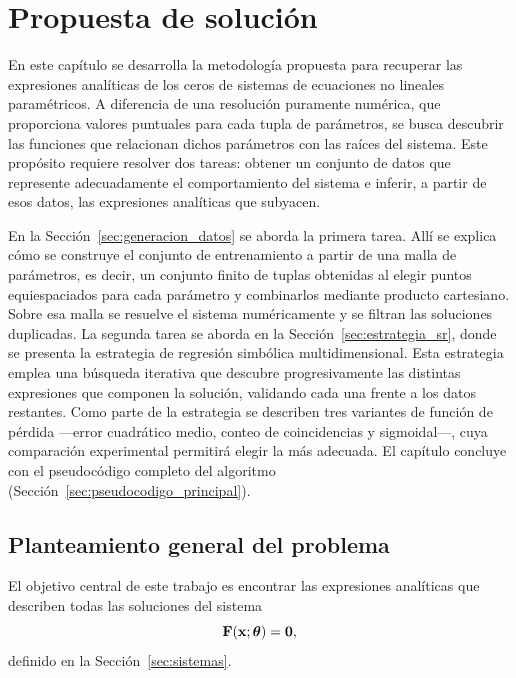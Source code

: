 \chapter{Propuesta de solución}\label{sec:propuesta}

En este capítulo se desarrolla la metodología propuesta para recuperar las expresiones analíticas de los ceros de sistemas de ecuaciones no lineales paramétricos. A diferencia de una resolución puramente numérica, que proporciona valores puntuales para cada tupla de parámetros, se busca descubrir las funciones que relacionan dichos parámetros con las raíces del sistema. Este propósito requiere resolver dos tareas: obtener un conjunto de datos que represente adecuadamente el comportamiento del sistema e inferir, a partir de esos datos, las expresiones analíticas que subyacen.

En la Sección~\ref{sec:generacion_datos} se aborda la primera tarea. Allí se explica cómo se construye el conjunto de entrenamiento a partir de una malla de parámetros, es decir, un conjunto finito de tuplas obtenidas al elegir puntos equiespaciados para cada parámetro y combinarlos mediante producto cartesiano. Sobre esa malla se resuelve el sistema numéricamente y se filtran las soluciones duplicadas. La segunda tarea se aborda en la Sección~\ref{sec:estrategia_sr}, donde se presenta la estrategia de regresión simbólica multidimensional. Esta estrategia emplea una búsqueda iterativa que descubre progresivamente las distintas expresiones que componen la solución, validando cada una frente a los datos restantes. Como parte de la estrategia se describen tres variantes de función de pérdida —error cuadrático medio, conteo de coincidencias y sigmoidal—, cuya comparación experimental permitirá elegir la más adecuada. El capítulo concluye con el pseudocódigo completo del algoritmo (Sección~\ref{sec:pseudocodigo_principal}).

\section{Planteamiento general del problema} \label{sec:planteamiento}

El objetivo central de este trabajo es encontrar las expresiones analíticas que describen todas las soluciones del sistema \begin{equation} \mathbf{F}(\mathbf{x}; \boldsymbol{\theta}) = \mathbf{0}, \label{eq:problema_original} \end{equation} definido en la Sección~\ref{sec:sistemas}.

